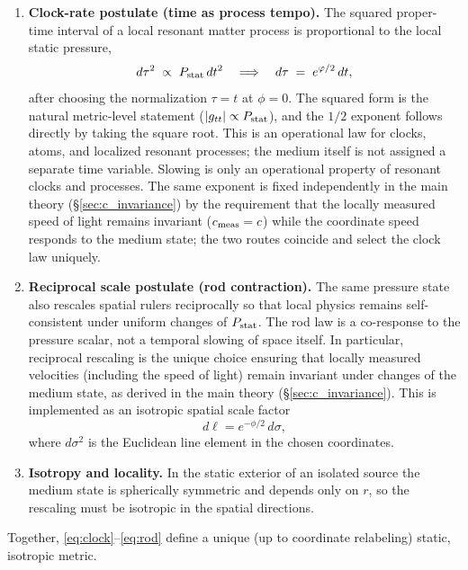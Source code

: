 \documentclass[11pt]{article}
\begin{document}
\begin{enumerate}
\item \textbf{Clock-rate postulate (time as process tempo).}
The squared proper-time interval of a local resonant matter process is proportional to the local static pressure,
\begin{equation}
d\tau^2 \;\propto\; P_{\rm stat}\,dt^2
\quad\Longrightarrow\quad
d\tau \;=\; e^{\phi/2}\,dt ,
\label{eq:clock}
\end{equation}
after choosing the normalization $\tau=t$ at $\phi=0$. The squared form is the natural metric-level statement ($|g_{tt}|\propto P_{\rm stat}$), and the $1/2$ exponent follows directly by taking the square root. This is an operational law for clocks, atoms, and localized resonant processes; the medium itself is not assigned a separate time variable. Slowing is only an operational property of resonant clocks and processes. The same exponent is fixed independently in the main theory (\S\ref{sec:c_invariance}) by the requirement that the locally measured speed of light remains invariant ($c_{\rm meas}=c$) while the coordinate speed responds to the medium state; the two routes coincide and select the clock law uniquely.

\item \textbf{Reciprocal scale postulate (rod contraction).}
The same pressure state also rescales spatial rulers reciprocally so that local physics remains self-consistent under uniform changes of $P_{\rm stat}$. The rod law is a co-response to the pressure scalar, not a temporal slowing of space itself. In particular, reciprocal rescaling is the unique choice ensuring that locally measured velocities (including the speed of light) remain invariant under changes of the medium state, as derived in the main theory (\S\ref{sec:c_invariance}). This is implemented as an isotropic spatial scale factor
\begin{equation}
d\ell = e^{-\phi/2}\,d\sigma,
\label{eq:rod}
\end{equation}
where $d\sigma^2$ is the Euclidean line element in the chosen coordinates.

\item \textbf{Isotropy and locality.}
In the static exterior of an isolated source the medium state is spherically symmetric and depends only on $r$, so the rescaling must be isotropic in the spatial directions.
\end{enumerate}

Together, \eqref{eq:clock}--\eqref{eq:rod} define a unique (up to coordinate relabeling) static, isotropic metric.
\end{document}
